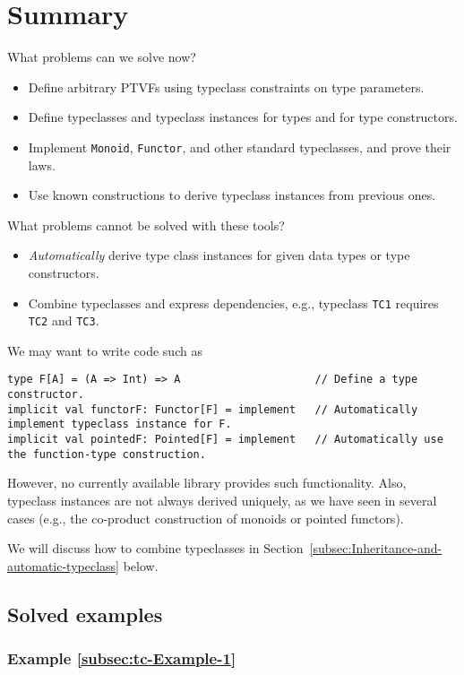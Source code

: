 \section{Summary}

What problems can we solve now?
\begin{itemize}
\item Define arbitrary PTVFs using typeclass constraints on type parameters.
\item Define typeclasses and typeclass instances for types and for type
constructors.
\item Implement \lstinline!Monoid!, \lstinline!Functor!, and other standard
typeclasses, and prove their laws.
\item Use known constructions to derive typeclass instances from previous
ones.
\end{itemize}
What problems cannot be solved with these tools?
\begin{itemize}
\item \emph{Automatically} derive type class instances for given data types
or type constructors.
\item Combine typeclasses and express dependencies, e.g., typeclass \lstinline!TC1!
requires \lstinline!TC2! and \lstinline!TC3!.
\end{itemize}
We may want to write code such as
\begin{lstlisting}
type F[A] = (A => Int) => A                     // Define a type constructor.
implicit val functorF: Functor[F] = implement   // Automatically implement typeclass instance for F.
implicit val pointedF: Pointed[F] = implement   // Automatically use the function-type construction.
\end{lstlisting}
However, no currently available library provides such functionality.
Also, typeclass instances are not always derived uniquely, as we have
seen in several cases (e.g., the co-product construction of monoids
or pointed functors).

We will discuss how to combine typeclasses in Section~\ref{subsec:Inheritance-and-automatic-typeclass}
below.

\subsection{Solved examples}

\subsubsection{Example \label{subsec:tc-Example-1}\ref{subsec:tc-Example-1}}

